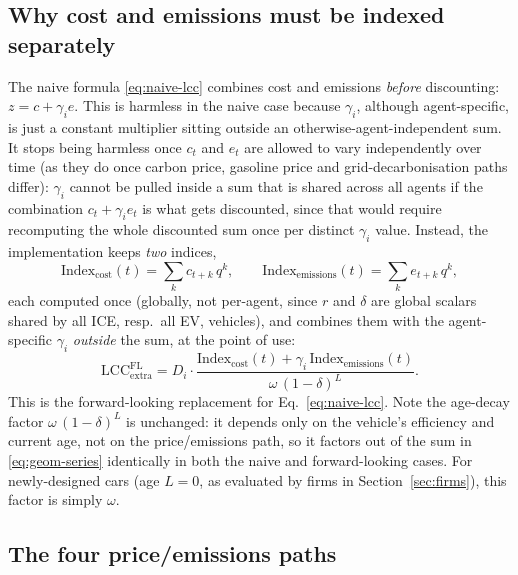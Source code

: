 \documentclass[11pt]{article}
\begin{document}
\subsection{Why cost and emissions must be indexed separately}
\label{sec:separation}

The naive formula \eqref{eq:naive-lcc} combines cost and emissions
\emph{before} discounting: $z = c + \gamma_i e$. This is harmless in the
naive case because $\gamma_i$, although agent-specific, is just a constant
multiplier sitting outside an otherwise-agent-independent sum. It stops
being harmless once $c_t$ and $e_t$ are allowed to vary independently over
time (as they do once carbon price, gasoline price and grid-decarbonisation
paths differ): $\gamma_i$ cannot be pulled inside a sum that is shared
across all agents if the combination $c_t + \gamma_i e_t$ is what gets
discounted, since that would require recomputing the whole discounted sum
once per distinct $\gamma_i$ value. Instead, the implementation keeps
\emph{two} indices,
\begin{equation}
  \mathrm{Index}_{\mathrm{cost}}(t) = \sum_{k} c_{t+k}\, q^{k},
  \qquad
  \mathrm{Index}_{\mathrm{emissions}}(t) = \sum_{k} e_{t+k}\, q^{k},
  \label{eq:two-indices}
\end{equation}
each computed once (globally, not per-agent, since $r$ and $\delta$ are
global scalars shared by all ICE, resp.\ all EV, vehicles), and combines
them with the agent-specific $\gamma_i$ \emph{outside} the sum, at the point
of use:
\begin{equation}
  \mathrm{LCC}_{\mathrm{extra}}^{\mathrm{FL}}
  = D_i \cdot
    \frac{\mathrm{Index}_{\mathrm{cost}}(t) + \gamma_i\, \mathrm{Index}_{\mathrm{emissions}}(t)}
         {\omega\,(1-\delta)^{L}} .
  \label{eq:fl-lcc}
\end{equation}
This is the forward-looking replacement for Eq.~\eqref{eq:naive-lcc}. Note
the age-decay factor $\omega\,(1-\delta)^{L}$ is unchanged: it depends only
on the vehicle's efficiency and current age, not on the price/emissions
path, so it factors out of the sum in \eqref{eq:geom-series} identically in
both the naive and forward-looking cases. For newly-designed cars (age
$L=0$, as evaluated by firms in Section~\ref{sec:firms}), this factor is
simply $\omega$.

\subsection{The four price/emissions paths}
\end{document}
